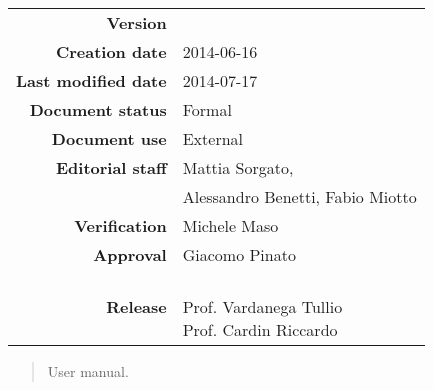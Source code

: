 


\newcommand{\Versione}{\versioneManualeUtente{}} %
\newcommand{\Data}{2014-06-16}				     %
\newcommand{\DataUltimaModifica}{2014-07-17}
\newcommand{\TipoDocumento}{User Manual}	 	%



\begin{center}
\begin{tabular}{r|l}
\textbf{Version} & \Versione{} \\
\textbf{Creation date} & \Data{} \\
\textbf{Last modified date} & \DataUltimaModifica{} \\
\textbf{Document status} & Formal \\		          %
\textbf{Document use} & External \\			          %
\textbf{Editorial staff} &  Mattia Sorgato,\\
& Alessandro Benetti, Fabio Miotto\\
\textbf{Verification} & Michele Maso\\  %
\textbf{Approval} & Giacomo Pinato\\				      %
\textbf{Release} & \parbox[t]{4cm}{\NomeGruppo{}\\Prof. Vardanega Tullio\\Prof. Cardin Riccardo\\ \Prop{} }\\
\end{tabular}
\end{center}

\vspace{0.05in}

\begin{abstract}
\begin{center}
\Progetto{} User manual.
\end{center}
\end{abstract}


